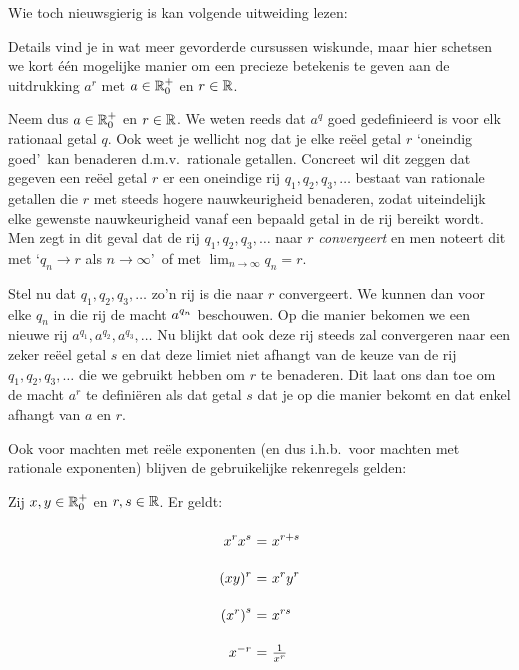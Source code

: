 \documentclass{ximera}
\begin{document}
Wie toch nieuwsgierig is kan volgende uitweiding lezen:


\begin{uitweiding}

Details vind je in wat meer gevorderde cursussen wiskunde, maar hier schetsen we kort \'{e}\'{e}n mogelijke manier om een precieze betekenis te geven
aan de uitdrukking $a^r$ met $a\in\mathbb{R}_0^+$ en $r\in\mathbb{R}$.

Neem dus $a\in\mathbb{R}_0^+$ en $r\in\mathbb{R}$. We weten reeds dat $a^q$
goed gedefinieerd is voor elk rationaal getal $q$. Ook weet je
wellicht nog dat je elke re\"eel getal $r$ \lq oneindig goed\rq\
kan benaderen d.m.v.~rationale getallen. Concreet wil dit zeggen
dat gegeven een re\"eel getal $r$ er een oneindige rij
$q_1,q_2,q_3,\ldots$ bestaat van rationale getallen die $r$ met
steeds hogere nauwkeurigheid benaderen, zodat uiteindelijk elke
gewenste nauwkeurigheid vanaf een bepaald getal in de rij bereikt
wordt. Men zegt in dit geval dat de rij $q_1,q_2,q_3,\ldots$ naar
$r$ \emph{convergeert} en men noteert dit met \lq $q_n\to r$ als
$n\to\infty$\rq\ of met $\lim_{n\to\infty}q_n=r$.

Stel nu dat $q_1,q_2,q_3,\ldots$ zo'n rij is die naar $r$
convergeert. We kunnen dan voor elke $q_n$ in die rij de macht
$\displaystyle a^{q_n}$ beschouwen. Op die manier bekomen we een nieuwe rij
$a^{q_1},a^{q_2},a^{q_3},\ldots$ 	
Nu blijkt dat ook deze rij steeds
zal convergeren naar een zeker re\"eel getal $s$ en dat deze
limiet niet afhangt van de keuze van de rij $q_1,q_2,q_3,\ldots$
die we gebruikt hebben  om $r$ te benaderen. Dit laat ons dan toe
om de macht $a^r$ te defini\"eren als dat getal $s$ dat je op die
manier bekomt en dat enkel afhangt van $a$ en $r$.

\end{uitweiding}

Ook voor machten met re\"ele exponenten (en dus i.h.b.~voor
machten met rationale exponenten) blijven de gebruikelijke
rekenregels  gelden:

\begin{proposition}
	Zij $x,y\in\mathbb{R}_0^+$ en $r,s\in\mathbb{R}$. Er geldt:
	\[
	\arraycolsep=1.4pt\def\arraystretch{2.2}
	\begin{array}{r@{\ =\ }l}
	\ds{x^{r}x^{s}}&\ds{x^{r+s}}\\
	\ds{(xy)^r}&\ds{x^ry^r}\\
	\ds{\left(x^{r}\right)^{s}}&\ds{x^{rs}}\\
	x^{-r} & \frac{1}{x^r} \\
	\end{array}
	\]
\end{proposition}
\end{document}
